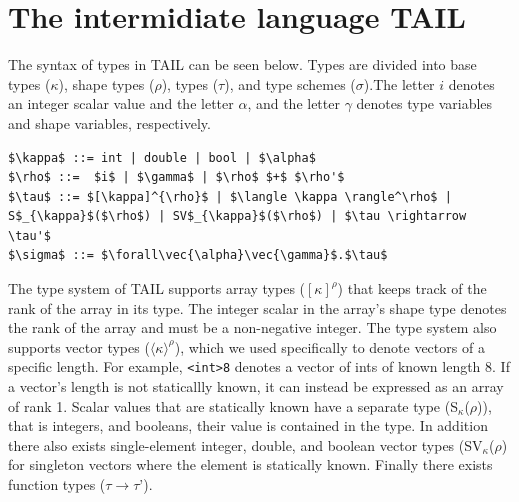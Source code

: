 \documentclass[11pt]{article}
\begin{document}





\section{The intermidiate language TAIL}
\label{sec:tail}

The syntax of types in TAIL can be seen below. Types are divided into base types ($\kappa$), shape types ($\rho$), types ($\tau$), and type schemes ($\sigma$).The letter $i$ denotes an integer scalar value and the letter $\alpha$, and the letter $\gamma$ denotes type variables and shape variables, respectively.
\begin{lstlisting}[numbers=none,frame=none]
$\kappa$ ::= int | double | bool | $\alpha$
$\rho$ ::=  $i$ | $\gamma$ | $\rho$ $+$ $\rho'$
$\tau$ ::= $[\kappa]^{\rho}$ | $\langle \kappa \rangle^\rho$ | S$_{\kappa}$($\rho$) | SV$_{\kappa}$($\rho$) | $\tau \rightarrow \tau'$
$\sigma$ ::= $\forall\vec{\alpha}\vec{\gamma}$.$\tau$
\end{lstlisting}
The type system of TAIL supports array types ($[\kappa]^{\rho}$) that keeps track of the rank of the array in its type.
The integer scalar in the array's shape type denotes the rank of the array and must be a non-negative integer.
The type system also supports vector types ($\langle \kappa \rangle^\rho$), which we used specifically to denote vectors of a specific length. For example, {\tt <int>8} denotes a vector of ints of known length 8. If a vector's length is not staticallly known, it can instead be expressed as an array of rank 1.
Scalar values that are statically known have a separate type (S$_{\kappa}$($\rho$)), that is integers, and booleans, their value is contained in the type.
In addition there also exists single-element integer, double, and boolean vector types (SV$_{\kappa}$($\rho$) for singleton vectors where the element is statically known.
Finally there exists function types ($\tau \rightarrow \tau$'). \\
\end{document}
